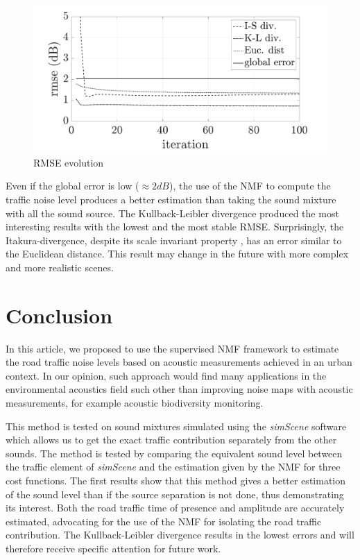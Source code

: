 \documentclass{article}
\begin{document}
\begin{sloppy}
\begin{figure}[t]
\centering
\includegraphics[width=.5\textwidth]{images/comparaison_RMSE_nbCl3.pdf}
\caption{RMSE evolution}
\label{fig:rmse}
\end{figure}

Even if the global error is low ($\approx 2 dB$), the use of the NMF to compute the traffic noise level produces a better estimation than taking the sound mixture with all the sound source. The Kullback-Leibler divergence produced the most interesting results with the lowest and the most stable RMSE. 
Surprisingly, the Itakura-divergence, despite its scale invariant property \cite{fevotte2011}, has an error similar to the Euclidean distance. This result may change in the future with more complex and more realistic scenes.


\section{Conclusion}

In this article, we proposed to use the supervised NMF framework to estimate the road traffic noise levels based on acoustic measurements achieved in an urban context. In our opinion, such approach would find many applications in the environmental acoustics field such other than improving noise maps with acoustic measurements, for example acoustic biodiversity monitoring. 

This method is tested on sound mixtures simulated using the \textit{simScene} software which allows us to get the exact traffic contribution separately from the other sounds. The method is tested by comparing the equivalent sound level between the traffic element of \textit{simScene} and the estimation given by the NMF for three cost functions. The first results show that this method gives a better estimation of the sound level than if the source separation is not done, thus demonstrating its interest. Both the road traffic time of presence and amplitude are accurately estimated, advocating for the use of the NMF for isolating the road traffic contribution. The Kullback-Leibler divergence results in the lowest errors and will therefore receive specific attention for future work. 


\end{sloppy}
\end{document}
